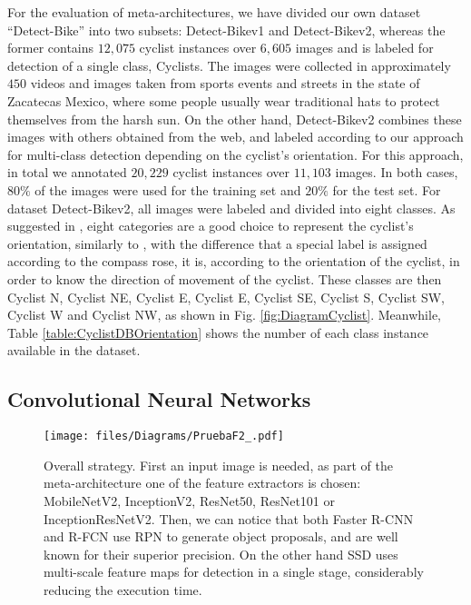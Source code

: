 \documentclass[journal]{IEEEtran}
\begin{document}
For the evaluation of meta-architectures, we have divided our own dataset ``Detect-Bike'' into two subsets: Detect-Bikev1 and Detect-Bikev2, whereas the former contains $12,075$ cyclist instances over $6,605$ images and is labeled for detection of a single class, Cyclists. The images were collected in approximately $450$ videos and images taken from sports events and streets in the state of Zacatecas Mexico, where some people usually wear traditional hats to protect themselves from the harsh sun. On the other hand, Detect-Bikev2 combines these images with others obtained from the web, and labeled according to our approach for multi-class detection depending on the cyclist's orientation.  For this approach, in total we annotated $20,229$ cyclist instances over $11,103$ images. In both cases, $80\%$ of the images were used for the training set and $20\%$ for the test set. For dataset Detect-Bikev2, all images were labeled and divided into eight classes. As suggested in \cite{guindel2018fast}, eight categories are a good choice to represent the cyclist's orientation, similarly to \cite{tian2015bfast}, with the difference that a special label is assigned according to the compass rose, it is, according to the orientation of the cyclist, in order to know the direction of movement of the cyclist. These classes are then Cyclist N, Cyclist NE, Cyclist E, Cyclist E, Cyclist SE, Cyclist S, Cyclist SW, Cyclist W and Cyclist NW, as shown in Fig. \ref{fig:DiagramCyclist}. Meanwhile, Table \ref{table:CyclistDBOrientation} shows the number of each class instance available in the dataset. 


\subsection{Convolutional Neural Networks}
\begin{figure*}[ht!]
\begin{center}
  \texttt{[image: files/Diagrams/PruebaF2\_.pdf]}
\caption{Overall strategy. First an input image is needed, as part of the meta-architecture one of the feature extractors is chosen: MobileNetV2, InceptionV2,  ResNet50, ResNet101 or InceptionResNetV2. Then, we can notice that both Faster R-CNN and R-FCN use RPN to generate object proposals, and are well known for their superior precision. On the other hand SSD uses multi-scale feature maps for detection in a single stage, considerably reducing the execution time.}
\label{fig:DiagramArch}       \end{center}
\end{figure*}
\end{document}
